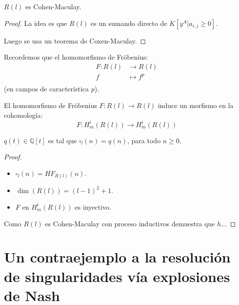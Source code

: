 \documentclass[12pt]{report}
\newcounter{it}
\theoremstyle{largebreak}
\newcommand\cf[3]{\ensuremath{#1:#2\rightarrow#3}}
\begin{document}
    \begin{theor}
        $R(l)$ es Cohen-Maculay.        
    \end{theor}

    \begin{proof}
        La idea es que $R(l)$ es un sumando directo de $K[y^A\Big|a_{ i,j}\geq0]$.

        Luego se usa un teorema de Coxen-Maculay.
    \end{proof}

    Recordemos que el homomorfismo de Fröbenius:
    \begin{equation*}
        \begin{split}
            F:R(l)&\rightarrow R(l)\\
            f&\mapsto f^p\\
        \end{split}
    \end{equation*}
    (en campos de característica $p$).

    \begin{propo}
        El homomorfismo de Fröbenius $\cf{F}{R(l)}{R(l)}$ induce un morfismo en la cohomología:
        \begin{equation*}
            \cf{F}{H_m^i(R(l))}{H_m^i(R(l))}
        \end{equation*}
    \end{propo}

    \begin{theor}
        $q(t)\in\mathbb{Q}[t]$ es tal que $\square_l(n)=q(n)$, para todo $n\geq0$.
    \end{theor}

    \begin{proof}
        \begin{itemize}
            \item $\square_l(n)=HF_{ R(l)}(n)$.
            \item $\dim(R(l))=(l-1)^2+1$.
            \item $F$ en $H_m^i(R(l))$ es inyectivo.
        \end{itemize}
        Como $R(l)$ es Cohen-Maculay con proceso inductivos demuestra que $h$...
    \end{proof}

    \chapter{Un contraejemplo a la resolución de singularidades vía explosiones de Nash}
\end{document}
